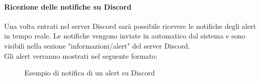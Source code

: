 \paragraph{Ricezione delle notifiche su Discord}
Una volta entrati nel server Discord sarà possibile ricevere le notifiche degli alert in tempo reale. Le notifiche vengono inviate in automatico dal sistema e sono visibili nella sezione "informazioni/alert" del server Discord. \\
Gli alert verranno mostrati nel seguente formato:
\begin{figure}[H]
    \centering
    \caption{Esempio di notifica di un alert su Discord}
    \label{fig:my_label}
\end{figure}